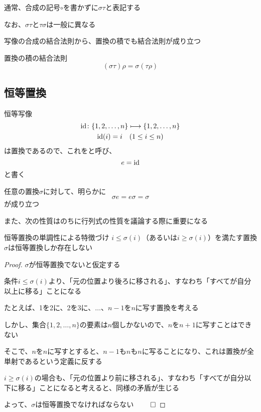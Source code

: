 \documentclass[../../../topic_linear-algebra]{subfiles}
\begin{document}
通常、合成の記号$\circ$を書かずに$\sigma \tau$と表記する

\br

なお、$\sigma\tau$と$\tau\sigma$は一般に異なる

\br

写像の合成の結合法則から、置換の積でも結合法則が成り立つ

\begin{theorem}{置換の積の結合法則}
  \begin{equation*}
    (\sigma \tau) \rho = \sigma (\tau \rho)
  \end{equation*}
\end{theorem}

\subsection{恒等置換}

恒等写像
\begin{gather*}
  \operatorname{id}\colon \{ 1,2,\ldots,n \} \longmapsto \{ 1,2,\ldots,n \} \\
  \operatorname{id}(i) = i \quad (1 \leq i \leq n)
\end{gather*}
は置換であるので、これをと呼び、
\begin{equation*}
  e = \operatorname{id}
\end{equation*}
と書く

\br

任意の置換$\sigma$に対して、明らかに
\begin{equation*}
  \sigma e = e \sigma = \sigma
\end{equation*}
が成り立つ

\br

また、次の性質はのちに行列式の性質を議論する際に重要になる

\begin{theorem}{恒等置換の単調性による特徴づけ}\label{thm:identity-permutation-characterized-by-monotonicity}
  $i \leq \sigma(i)$（あるいは$i \geq \sigma(i)$）を満たす置換$\sigma$は恒等置換しか存在しない
\end{theorem}

\begin{proof}
  $\sigma$が恒等置換でないと仮定する

  条件$i \leq \sigma(i)$より、「元の位置より後ろに移される」、すなわち「すべてが自分以上に移る」ことになる

  たとえば、1を2に、2を3に、$\ldots$、$n-1$を$n$に写す置換を考える

  しかし、集合$\{ 1,2,\ldots,n \}$の要素は$n$個しかないので、$n$を$n+1$に写すことはできない

  そこで、$n$を$n$に写すとすると、$n-1$も$n$も$n$に写ることになり、これは置換が全単射であるという定義に反する

  \br

  $i \geq \sigma(i)$の場合も、「元の位置より前に移される」、すなわち「すべてが自分以下に移る」ことになると考えると、同様の矛盾が生じる

  \br

  よって、$\sigma$は恒等置換でなければならない $\qed$
\end{proof}
\end{document}
